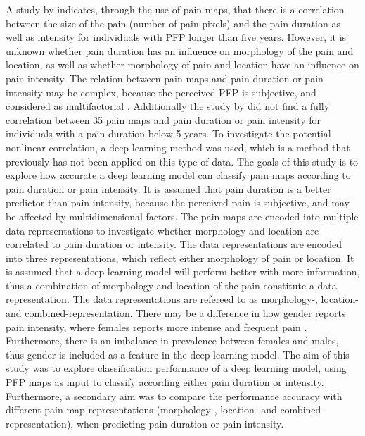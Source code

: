 \noindent
A study by \citeauthor{Boudreau2017} \citep{Boudreau2017} indicates, through the use of pain maps, that there is a correlation between the size of the pain (number of pain pixels) and the pain duration as well as intensity for individuals with PFP longer than five years.\citep{Boudreau2017}
However, it is unknown whether pain duration has an influence on morphology of the pain and location, as well as  whether morphology of pain and location have an influence on pain intensity.
The relation between pain maps and pain duration or pain intensity may be complex, because the perceived PFP is subjective, and considered as multifactorial \citep{Dansie2013}. Additionally the study by \citeauthor{Boudreau2017} \citep{Boudreau2017} did not find a fully correlation between 35 pain maps and pain duration or pain intensity for individuals with a pain duration below 5 years. To investigate the potential nonlinear correlation, a deep learning method was used, which is a method that previously has not been applied on this type of data. \newline
\noindent
The goals of this study is to explore how accurate a deep learning model can classify pain maps according to pain duration or pain intensity. It is assumed that pain duration is a better predictor than pain intensity, because the perceived pain is subjective, and may be affected by multidimensional factors. 
The pain maps are encoded into multiple data representations to investigate whether morphology and location are correlated to pain duration or intensity.\newline
\noindent
The data representations are encoded into three representations, which reflect either morphology of pain or location. It is assumed that a deep learning model will perform better with more information, thus a combination of morphology and location of the pain constitute a data representation.  The data representations are refereed to as morphology-, location- and combined-representation.
There may be a difference in how gender reports pain intensity, where females reports more intense and frequent pain \citep{Pieh2012}. Furthermore, there is an imbalance in prevalence between females and males, thus gender is included as a feature in the deep learning model. \newline
\noindent
The aim of this study was to explore classification performance of a deep learning model, using PFP maps as input to classify according either pain duration or intensity.
Furthermore, a secondary aim was to compare the performance accuracy with different pain map representations (morphology-, location- and combined-representation), when predicting pain duration or pain intensity. 